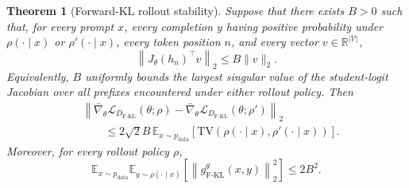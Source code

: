 \documentclass{article} %
\theoremstyle{plain}
\newtheorem{theorem}{Theorem}[section]
\theoremstyle{definition}
\theoremstyle{remark}
\begin{document}
\begin{theorem}[Forward-KL rollout stability]
\label{thm:forward-rollout-stability}
Suppose that there exists $B>0$ such that, for every prompt $x$, every
completion $y$ having positive probability under $\rho(\cdot\mid x)$ or
$\rho'(\cdot\mid x)$, every token position $n$, and every vector
$v\in\mathbb R^{|\mathcal V|}$,
\begin{equation}
    \left\lVert J_\theta(h_n)^\top v\right\rVert_2
    \le B\lVert v\rVert_2.
    \label{eq:jacobian-bound}
\end{equation}
Equivalently, $B$ uniformly bounds the largest singular value of the
student-logit Jacobian over all prefixes encountered under either rollout
policy.  Then
\begin{align}
    &\left\lVert
        \bar\nabla_\theta
        \mathcal L_{D_{\mathrm{F\text{-}KL}}}(\theta;\rho)
        -
        \bar\nabla_\theta
        \mathcal L_{D_{\mathrm{F\text{-}KL}}}(\theta;\rho')
    \right\rVert_2\nonumber\\
    &\qquad\le
    2\sqrt2 B\,
    \mathbb E_{x\sim p_{\mathrm{data}}}
    \left[
        \mathrm{TV}\!\left(
            \rho(\cdot\mid x),
            \rho'(\cdot\mid x)
        \right)
    \right].
    \label{eq:forward-rollout-stability-bound}
\end{align}
Moreover, for every rollout policy $\rho$,
\begin{equation}
    \mathbb E_{x\sim p_{\mathrm{data}}}
    \mathbb E_{y\sim\rho(\cdot\mid x)}
    \left[
        \left\lVert
            g_{\mathrm{F\text{-}KL}}^\theta(x,y)
        \right\rVert_2^2
    \right]
    \le 2B^2.
    \label{eq:forward-gradient-second-moment}
\end{equation}
\end{theorem}
\end{document}
